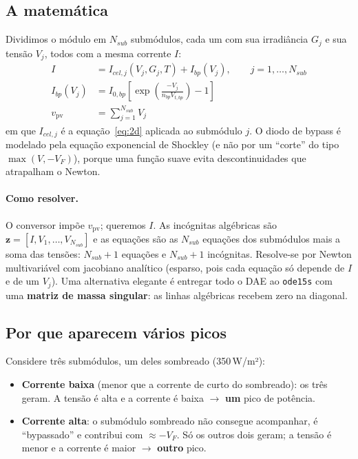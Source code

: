 \documentclass[11pt,a4paper]{article}
\newcommand{\vpv}{v_{\mathrm{pv}}}
\begin{document}
\subsection{A matemática}

Dividimos o módulo em $N_{sub}$ submódulos, cada um com sua irradiância $G_j$ e sua tensão
$V_j$, todos com a mesma corrente $I$:
\begin{align}
I &= I_{cel,j}(V_j, G_j, T) + I_{bp}(V_j), \qquad j=1,\dots,N_{sub}\\
I_{bp}(V_j) &= I_{0,bp}\left[\exp\!\left(\frac{-V_j}{n_{bp}V_{t,bp}}\right)-1\right]\\
\vpv &= \sum_{j=1}^{N_{sub}} V_j
\end{align}
em que $I_{cel,j}$ é a equação~\eqref{eq:2d} aplicada ao submódulo $j$. O diodo de bypass é
modelado pela equação exponencial de Shockley (e não por um ``corte'' do tipo
$\max(V,-V_F)$), porque uma função suave evita descontinuidades que atrapalham o Newton.

\paragraph{Como resolver.} O conversor impõe $\vpv$; queremos $I$. As incógnitas algébricas
são $\mathbf z=[I,V_1,\dots,V_{N_{sub}}]$ e as equações são as $N_{sub}$ equações dos
submódulos mais a soma das tensões: $N_{sub}+1$ equações e $N_{sub}+1$ incógnitas. Resolve-se
por Newton multivariável com jacobiano analítico (esparso, pois cada equação só depende de
$I$ e de um $V_j$). Uma alternativa elegante é entregar todo o DAE ao \texttt{ode15s} com uma
\textbf{matriz de massa singular}: as linhas algébricas recebem zero na diagonal.

\subsection{Por que aparecem vários picos}

Considere três submódulos, um deles sombreado (350\,W/m²):
\begin{itemize}
\item \textbf{Corrente baixa} (menor que a corrente de curto do sombreado): os três geram.
A tensão é alta e a corrente é baixa $\to$ \textbf{um} pico de potência.
\item \textbf{Corrente alta}: o submódulo sombreado não consegue acompanhar, é ``bypassado''
e contribui com $\approx-V_F$. Só os outros dois geram; a tensão é menor e a corrente é
maior $\to$ \textbf{outro} pico.
\end{itemize}
\end{document}
